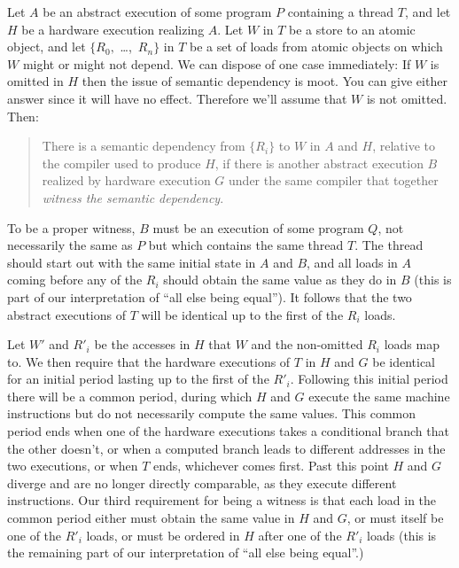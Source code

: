 Let $A$ be an abstract execution of some program $P$ containing a
thread $T$, and let $H$ be a hardware execution realizing $A$.
Let $W$ in $T$ be a store to an atomic object, and let $\{R_0,$
\ldots,~$R_n\}$ in $T$ be a set of loads from atomic objects on which
$W$ might or might not depend.
We can dispose of one case immediately: If $W$ is omitted in $H$ then
the issue of semantic dependency is moot.
You can give either answer since it will have no effect.
Therefore we'll assume that $W$ is not omitted.
Then:
\begin{quote}
There is a semantic dependency from $\{R_i\}$ to $W$ in $A$ and $H$,
relative to the compiler used to produce $H$, if there is another
abstract execution $B$ realized by hardware execution $G$ under the
same compiler that together \emph{witness the semantic dependency}.
\end{quote}

To be a proper witness, $B$ must be an execution of some program $Q$,
not necessarily the same as $P$ but which contains the same thread $T$.
The thread should start out with the same initial state in $A$ and
$B$, and all loads in $A$ coming before any of the $R_i$ should obtain
the same value as they do in $B$ (this is part of our interpretation
of ``all else being equal'').
It follows that the two abstract executions of $T$ will be identical
up to the first of the $R_i$ loads.

Let $W'$ and $R'_i$ be the accesses in $H$ that $W$ and the
non-omitted $R_i$ loads map to.
We then require that the hardware executions of $T$ in $H$ and $G$ be
identical for an initial period lasting up to the first of the $R'_i$.
Following this initial period there will be a common period, during
which $H$ and $G$ execute the same machine instructions but do not
necessarily compute the same values.
This common period ends when one of the hardware executions
takes a conditional branch that the other doesn't, or when a computed
branch leads to different addresses in the two executions, or when $T$
ends, whichever comes first.
Past this point $H$ and $G$ diverge and are no longer directly
comparable, as they execute different instructions.
Our third requirement for being a witness is that each load in the
common period either must obtain the same value in $H$ and $G$, or
must itself be one of the $R'_i$ loads, or must be ordered in $H$
after one of the $R'_i$ loads (this is the remaining part of our
interpretation of ``all else being equal''.)

